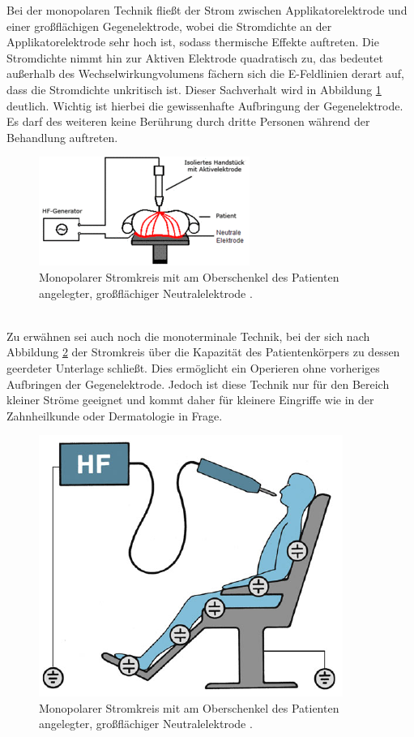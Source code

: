 \documentclass[letterpaper,12pt]{article}
\begin{document}
			Bei der monopolaren Technik fließt der Strom zwischen Applikatorelektrode und einer großflächigen Gegenelektrode, wobei die Stromdichte an der Applikatorelektrode sehr hoch ist, sodass thermische Effekte auftreten.
			Die Stromdichte nimmt hin zur Aktiven Elektrode quadratisch zu, das bedeutet außerhalb des Wechselwirkungvolumens fächern sich die E-Feldlinien derart auf, dass die Stromdichte unkritisch ist. Dieser Sachverhalt wird in Abbildung \ref{fig:monopolareTechnik2} deutlich. Wichtig ist hierbei die gewissenhafte Aufbringung der Gegenelektrode. Es darf des weiteren keine Berührung durch dritte Personen während der Behandlung auftreten.
			\begin{figure}[h!] 
				\centering
				\includegraphics[width=0.35\columnwidth]{images/_monopolareTechnik.png}
				\caption{		 
					Monopolarer Stromkreis mit am Oberschenkel des Patienten angelegter, großflächiger Neutralelektrode \cite{wiki:HF}.}
				\label{fig:monopolareTechnik2}
			\end{figure}\\
			Zu erwähnen sei auch noch die monoterminale Technik, bei der sich nach Abbildung \ref{fig:monoterminaleTechnik} der Stromkreis über die Kapazität des Patientenkörpers zu dessen geerdeter Unterlage schließt. Dies ermöglicht ein Operieren ohne vorheriges Aufbringen der Gegenelektrode. Jedoch ist diese Technik nur für den Bereich kleiner Ströme geeignet und kommt daher für kleinere Eingriffe wie in der Zahnheilkunde oder Dermatologie in Frage. 
			\begin{figure}[h!] 
				\centering
				\includegraphics[width=0.35\columnwidth]{images/monoterminaleTechnik.png}
				\caption{		 
					Monopolarer Stromkreis mit am Oberschenkel des Patienten angelegter, großflächiger Neutralelektrode \cite{kramme2016medizintechnik}.}
				\label{fig:monoterminaleTechnik}
			\end{figure}\\
\end{document}

